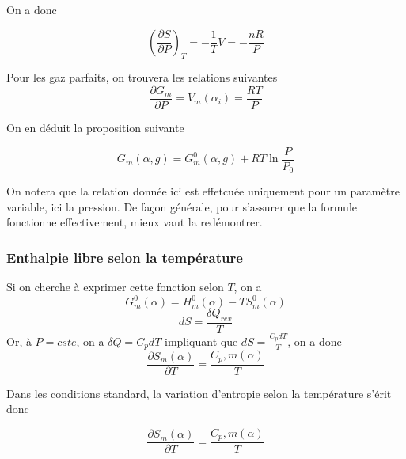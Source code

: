 On a donc

\begin{equation}
\left ( \frac{\partial S}{\partial P}\right )_T=-\frac{1}{T}V = - \frac{nR}{P}
\end{equation}

\begin{corollary}

Pour les gaz parfaits, on trouvera les relations suivantes
$$\frac {\partial G_m}{\partial P}=V_m(\alpha_i) = \frac{RT}{P}$$
\end{corollary}

On en déduit la proposition suivante

\begin{proposition}
\begin{equation}
G_m( \alpha, g)=G_m^0(\alpha, g)+RT\ln\frac{P}{P_0}
\end{equation}
\end{proposition}

\begin{remark}
On notera que la relation donnée ici est effetcuée uniquement pour un paramètre variable, ici la pression. De façon générale, pour s'assurer que la formule fonctionne effectivement, mieux vaut la redémontrer.
\end{remark}

\subsubsection{Enthalpie libre selon la température}

Si on cherche à exprimer cette fonction selon $T$, on a 
$$G_m^0(\alpha)=H_m^0(\alpha)-TS_m^0(\alpha)$$
$$dS=\frac{\delta Q_{rev}}{T}$$
Or, à $P=cste$, on a $\delta Q = C_pdT$ impliquant que $dS=\frac{C_pdT}{T}$, on a donc
\begin{equation}
\frac{\partial S_m(\alpha)}{\partial T }= \frac{C_p,m(\alpha)}{T}
\end{equation}

\begin{proposition}

Dans les conditions standard, la variation d'entropie selon la température s'érit donc

$$\frac{\partial S_m(\alpha)}{\partial T }= \frac{C_p,m(\alpha)}{T}$$

\end{proposition}

